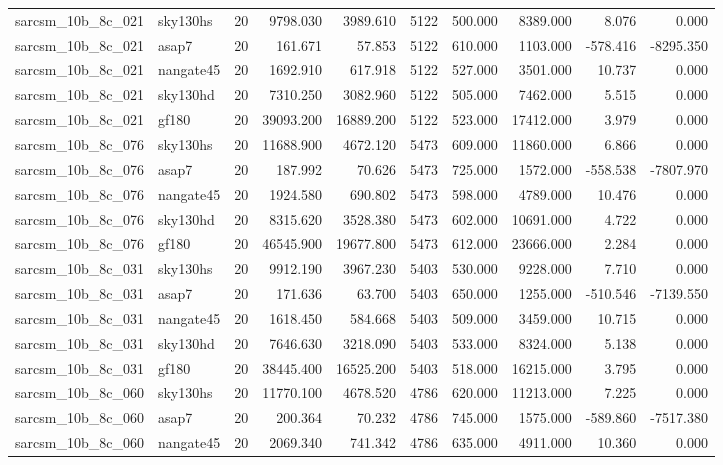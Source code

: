 \documentclass{article}
\begin{document}
\begin{longtable}{llrrrrrrrr}
sarcsm\_10b\_8c\_021 & sky130hs & 20 & 9798.030 & 3989.610 & 5122 & 500.000 & 8389.000 & 8.076 & 0.000 \\
sarcsm\_10b\_8c\_021 & asap7 & 20 & 161.671 & 57.853 & 5122 & 610.000 & 1103.000 & -578.416 & -8295.350 \\
sarcsm\_10b\_8c\_021 & nangate45 & 20 & 1692.910 & 617.918 & 5122 & 527.000 & 3501.000 & 10.737 & 0.000 \\
sarcsm\_10b\_8c\_021 & sky130hd & 20 & 7310.250 & 3082.960 & 5122 & 505.000 & 7462.000 & 5.515 & 0.000 \\
sarcsm\_10b\_8c\_021 & gf180 & 20 & 39093.200 & 16889.200 & 5122 & 523.000 & 17412.000 & 3.979 & 0.000 \\
sarcsm\_10b\_8c\_076 & sky130hs & 20 & 11688.900 & 4672.120 & 5473 & 609.000 & 11860.000 & 6.866 & 0.000 \\
sarcsm\_10b\_8c\_076 & asap7 & 20 & 187.992 & 70.626 & 5473 & 725.000 & 1572.000 & -558.538 & -7807.970 \\
sarcsm\_10b\_8c\_076 & nangate45 & 20 & 1924.580 & 690.802 & 5473 & 598.000 & 4789.000 & 10.476 & 0.000 \\
sarcsm\_10b\_8c\_076 & sky130hd & 20 & 8315.620 & 3528.380 & 5473 & 602.000 & 10691.000 & 4.722 & 0.000 \\
sarcsm\_10b\_8c\_076 & gf180 & 20 & 46545.900 & 19677.800 & 5473 & 612.000 & 23666.000 & 2.284 & 0.000 \\
sarcsm\_10b\_8c\_031 & sky130hs & 20 & 9912.190 & 3967.230 & 5403 & 530.000 & 9228.000 & 7.710 & 0.000 \\
sarcsm\_10b\_8c\_031 & asap7 & 20 & 171.636 & 63.700 & 5403 & 650.000 & 1255.000 & -510.546 & -7139.550 \\
sarcsm\_10b\_8c\_031 & nangate45 & 20 & 1618.450 & 584.668 & 5403 & 509.000 & 3459.000 & 10.715 & 0.000 \\
sarcsm\_10b\_8c\_031 & sky130hd & 20 & 7646.630 & 3218.090 & 5403 & 533.000 & 8324.000 & 5.138 & 0.000 \\
sarcsm\_10b\_8c\_031 & gf180 & 20 & 38445.400 & 16525.200 & 5403 & 518.000 & 16215.000 & 3.795 & 0.000 \\
sarcsm\_10b\_8c\_060 & sky130hs & 20 & 11770.100 & 4678.520 & 4786 & 620.000 & 11213.000 & 7.225 & 0.000 \\
sarcsm\_10b\_8c\_060 & asap7 & 20 & 200.364 & 70.232 & 4786 & 745.000 & 1575.000 & -589.860 & -7517.380 \\
sarcsm\_10b\_8c\_060 & nangate45 & 20 & 2069.340 & 741.342 & 4786 & 635.000 & 4911.000 & 10.360 & 0.000 \\

\end{longtable}
\end{document}

